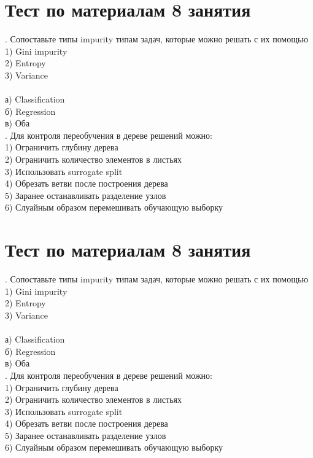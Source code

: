 \documentclass[10pt,a4paper]{article}
\author{Nikolay Anokhin}
\begin{document}
\thispagestyle{empty}

\section*{Тест по материалам 8 занятия}

. Сопоставьте типы impurity типам задач, которые можно решать с их помощью \\
1) Gini impurity \\
2) Entropy \\ 
3) Variance \\
\\
а) Classification \\
б) Regression \\
в) Оба \\

. Для контроля переобучения в дереве решений можно: \\
1) Ограничить глубину дерева \\
2) Ограничить количество элементов в листьях \\
3) Использовать surrogate split \\
4) Обрезать ветви после построения дерева \\
5) Заранее останавливать разделение узлов \\
6) Слуайным образом перемешивать обучающую выборку

\section*{Тест по материалам 8 занятия}

. Сопоставьте типы impurity типам задач, которые можно решать с их помощью \\
1) Gini impurity \\
2) Entropy \\ 
3) Variance \\
\\
а) Classification \\
б) Regression \\
в) Оба \\

. Для контроля переобучения в дереве решений можно: \\
1) Ограничить глубину дерева \\
2) Ограничить количество элементов в листьях \\
3) Использовать surrogate split \\
4) Обрезать ветви после построения дерева \\
5) Заранее останавливать разделение узлов \\
6) Слуайным образом перемешивать обучающую выборку
\end{document}
